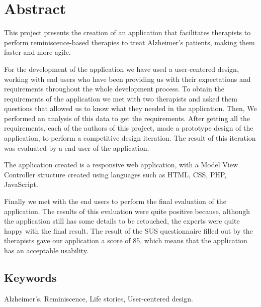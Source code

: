 
\chapter*{Abstract}

This project presents the creation of an application that facilitates therapists to perform reminiscence-based therapies to treat Alzheimer's patients, making them faster and more agile.  

For the development of the application we have used a user-centered design, working with end users who have been providing us with their expectations and requirements throughout the whole development process. To obtain the requirements of the application we met with two therapists and asked them questions that allowed us to know what they needed in the application. Then, We performed an analysis of this data to get the requirements. 
After getting all the requirements, each of the authors of this project, made a prototype design of the application, to perform a competitive design iteration. The result of this iteration was evaluated by a end user of the application.

The application created is a responsive web application, with a Model View Controller structure created using languages such as HTML, CSS, PHP, JavaScript.

Finally we met with the end users to perform the final evaluation of the application. The results of this evaluation were quite positive because, although the application still has some details to be retouched, the experts were quite happy with the final result. The result of the SUS questionnaire filled out by the therapists gave our application a score of 85, which means that the application has an acceptable usability.


\section*{Keywords}

\noindent Alzheimer's, Reminiscence, Life stories, User-centered design.



